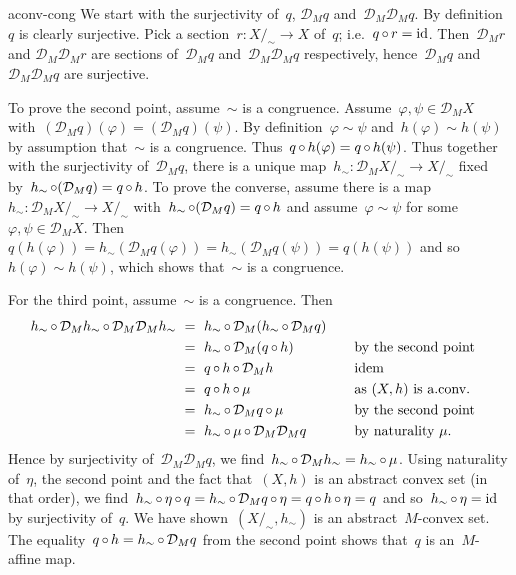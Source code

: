 \begin{solution}{aconv-cong}%
We start with the surjectivity of~$q$, $\mathcal{D}_M q$
    and~$\mathcal{D}_M \mathcal{D}_M q$.
By definition~$q$ is clearly surjective.
Pick a section~$r\colon X/_\sim \to X$ of~$q$;
    i.e.~$q \mathop{\circ} r = \mathrm{id}$.
Then~$\mathcal{D}_M r$
    and $\mathcal{D}_M \mathcal{D}_M r$
    are sections of~$\mathcal{D}_M q$ and~$\mathcal{D}_M \mathcal{D}_M q$
    respectively, hence~$\mathcal{D}_M q$ and~$\mathcal{D}_M \mathcal{D}_M q$
        are surjective.

To prove the second point,
    assume~$\sim$ is a congruence.
Assume~$\varphi, \psi \in \mathcal{D}_M X$ with~$
    (\mathcal{D}_M q)(\varphi) =
    (\mathcal{D}_M q)(\psi) $.
    By definition~$\varphi \sim \psi$ and~$h(\varphi) \sim h(\psi)$
        by assumption that~$\sim$ is a congruence.
    Thus~$q \mathop{\circ} h (\varphi) = q \mathop{\circ} h (\psi)$.
Thus together with the surjectivity of~$\mathcal{D}_M q$,
    there is a unique map~$h_\sim \colon \mathcal{D}_M X/_\sim \to
        X/_\sim$ fixed by~$h_\sim \mathop{\circ} (\mathcal{D}_M q) = q \mathop{\circ} h$.
To prove the converse, assume there is a
    map~$h_\sim \colon \mathcal{D}_M X/_\sim \to
        X/_\sim$ with~$h_\sim \mathop{\circ} (\mathcal{D}_M q) = q \mathop{\circ} h$
            and assume~$\varphi \sim \psi$
            for some~$\varphi,\psi \in \mathcal{D}_M X$.
    Then~$q(h(\varphi))
    = h_\sim (\mathcal{D}_M q(\varphi))
    = h_\sim (\mathcal{D}_M q(\psi))
    = q(h(\psi))$ and so~$h(\varphi) \sim h(\psi)$,
    which shows that~$\sim$ is a congruence.

For the third point, assume~$\sim$ is a congruence.
Then
\begin{alignat*}{3}
    h_\sim \mathop{\circ}
    \mathcal{D}_M h_\sim  \mathop{\circ}
    \mathcal{D}_M \mathcal{D}_M h_\sim 
&\ =\ h_\sim \mathop{\circ}
    \mathcal{D}_M (h_\sim \mathop{\circ} \mathcal{D}_M q)\\
&\ =\ h_\sim \mathop{\circ}
    \mathcal{D}_M (q \mathop{\circ} h) &\quad & \text{by the second point}\\
    &\ =\ q \mathop{\circ} h \mathop{\circ} \mathcal{D}_M h && \text{idem}\\
    &\ =\ q \mathop{\circ} h \mathop{\circ} \mu && \text{as $(X,h)$ is a.conv.}\\
    &\ =\ h_\sim \mathop{\circ} \mathcal{D}_M q \mathop{\circ} \mu && \text{by the second point} \\
    &\ =\ h_\sim \mathop{\circ} \mu \mathop{\circ}
    \mathcal{D}_M \mathcal{D}_M q
    && \text{by naturality~$\mu$.}
\end{alignat*}
    Hence by surjectivity of~$\mathcal{D}_M \mathcal{D}_M q$,
        we find~$h_\sim \mathop{\circ} \mathcal{D}_M h_\sim
            = h_\sim \mathop{\circ} \mu$.
    Using naturality of~$\eta$,
        the second point
            and the fact that~$(X,h)$ is an abstract convex set
            (in that order),
            we find~$h_\sim \mathop{\circ} \eta \mathop{\circ} q
        = h_\sim \mathop{\circ} \mathcal{D}_M q \mathop{\circ} \eta
        = q \mathop{\circ} h \mathop{\circ} \eta
        = q $ and so~$h_\sim \mathop{\circ} \eta = \mathrm{id}$ by surjectivity of~$q$.
We have shown~$(X/_\sim, h_\sim)$ is an abstract~$M$-convex set.
    The equality~$q \mathop{\circ} h = h_\sim \mathop{\circ} \mathcal{D}_M q$
        from the second point shows that~$q$ is
        an~$M$-affine map.
\end{solution}

